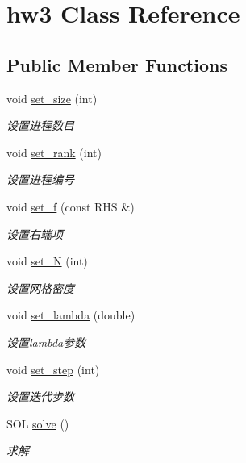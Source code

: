 \hypertarget{classhw3}{}\section{hw3 Class Reference}
\label{classhw3}
\subsection*{Public Member Functions}
\begin{DoxyCompactItemize}
\item 
void \hyperlink{classhw3_acdd257e9849222197ea2802daff7235b}{set\+\_\+size} (int)
\begin{DoxyCompactList}\small\item\em 设置进程数目 \end{DoxyCompactList}\item 
void \hyperlink{classhw3_a1f277d537a9091e40bf34ca6b1f1f133}{set\+\_\+rank} (int)
\begin{DoxyCompactList}\small\item\em 设置进程编号 \end{DoxyCompactList}\item 
void \hyperlink{classhw3_af0e7bc760ae9e229d6fb5d4e31175010}{set\+\_\+f} (const R\+HS \&)
\begin{DoxyCompactList}\small\item\em 设置右端项 \end{DoxyCompactList}\item 
void \hyperlink{classhw3_a0acf7fc706e4711d13fe1656d9391f5a}{set\+\_\+N} (int)
\begin{DoxyCompactList}\small\item\em 设置网格密度 \end{DoxyCompactList}\item 
void \hyperlink{classhw3_a7ff2691e20e38b4dbedb0fe71578bfd4}{set\+\_\+lambda} (double)
\begin{DoxyCompactList}\small\item\em 设置lambda参数 \end{DoxyCompactList}\item 
void \hyperlink{classhw3_a2a474121810abd2e4b455892c0e96a84}{set\+\_\+step} (int)
\begin{DoxyCompactList}\small\item\em 设置迭代步数 \end{DoxyCompactList}\item 
S\+OL \hyperlink{classhw3_aff03f6d8dad50d226cd493c1789790fe}{solve} ()
\begin{DoxyCompactList}\small\item\em 求解 \end{DoxyCompactList}\item 

\end{DoxyCompactItemize}
